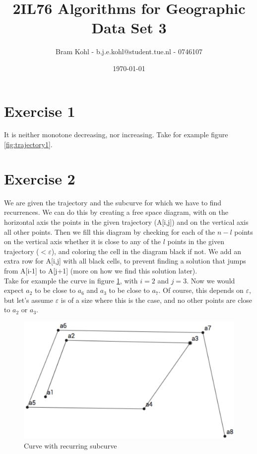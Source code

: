 \documentclass[a4paper,11pt]{article}
\title{
	2IL76 Algorithms for Geographic Data Set 3 \\
}
\author{
	Bram Kohl - b.j.e.kohl@student.tue.nl - 0746107
}
\date{\today}
\begin{document}
	\maketitle
	
\section*{Exercise 1}
It is neither monotone decreasing, nor increasing. Take for example figure \ref{fig:trajectory1}.

\section*{Exercise 2}
We are given the trajectory and the subcurve for which we have to find recurrences. We can do this by creating a free space diagram, with on the horizontal axis the points in the given trajectory (A[i,j]) and on the vertical axis all other points. Then we fill this diagram by checking for each of the $n-l$ points on the vertical axis whether it is close to any of the $l$ points in the given trajectory ($< \varepsilon$), and coloring the cell in the diagram black if not. We add an extra row for A[i,j] with all black cells, to prevent finding a solution that jumps from A[i-1] to A[j+1] (more on how we find this solution later).\\

Take for example the curve in figure \ref{fig:curve1}, with $i = 2$ and $j = 3$. Now we would expect $a_2$ to be close to $a_6$ and $a_3$ to be close to $a_7$. Of course, this depends on $\varepsilon$, but let's assume $\varepsilon$ is of a size where this is the case, and no other points are close to $a_2$ or $a_3$.

\begin{figure}[H]
	\centering
	\includegraphics[scale=0.5]{curve1}
	\caption{Curve with recurring subcurve}
	\label{fig:curve1}
\end{figure}
\end{document}
